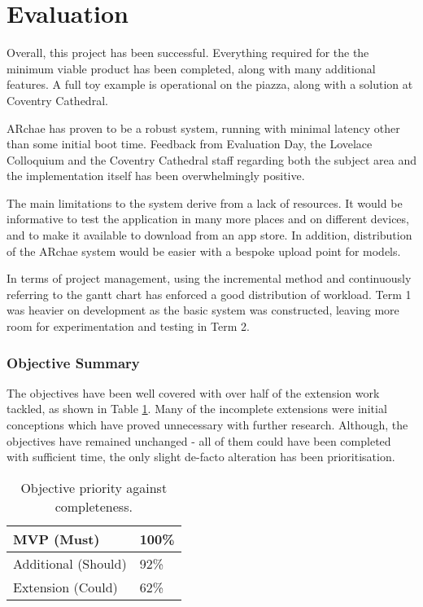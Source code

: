 \documentclass[12pt, a4paper]{article}
\begin{document}
\newpage
\section{Evaluation}
\label{Evaluation}
Overall, this project has been successful. Everything required for the the minimum viable product has been completed, along with many additional features. A full toy example is operational on the piazza, along with a solution at Coventry Cathedral. 

ARchae has proven to be a robust system, running with minimal latency other than some initial boot time. Feedback from Evaluation Day, the Lovelace Colloquium and the Coventry Cathedral staff regarding both the subject area and the implementation itself has been overwhelmingly positive.

The main limitations to the system derive from a lack of resources. It would be informative to test the application in many more places and on different devices, and to make it available to download from an app store. In addition, distribution of the ARchae system would be easier with a bespoke upload point for models.

In terms of project management, using the incremental method and continuously referring to the gantt chart has enforced a good distribution of workload. Term 1 was heavier on development as the basic system was constructed, leaving more room for experimentation and testing in Term 2.

\subsubsection{Objective Summary}
The objectives have been well covered with over half of the extension work tackled, as shown in Table \ref{table:objectivesummary}. Many of the incomplete extensions were initial conceptions which have proved unnecessary with further research. Although, the objectives have remained unchanged - all of them could have been completed with sufficient time, the only slight de-facto alteration has been prioritisation. 

\begin{table}[H]
\centering
\begin{tabular}{|l|l|}
\hline
MVP (Must)          & 100\% \\ \hline
Additional (Should) & 92\%  \\ \hline
Extension (Could)   & 62\%  \\ \hline
\end{tabular}
\caption{Objective priority against completeness.}
\label{table:objectivesummary}
\end{table}
\end{document}
